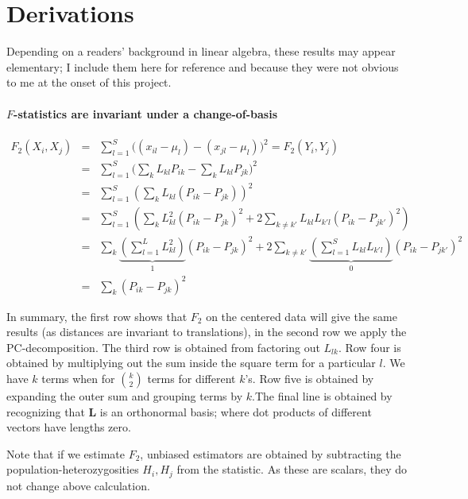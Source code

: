 \documentclass[12pt,fullpage, a4paper]{article}
\newcommand{\ML}{\mathbf{L}} %
\begin{document}
\newpage


\newpage
\appendix
\section{Derivations}\label{appendix:fonpc}
\setcounter{equation}{0}
\renewcommand{\theequation}{\thesection\arabic{equation}}
Depending on a readers' background in linear algebra, these results may appear elementary; I include them here for reference and because they were not obvious to me at the onset of this project.
\paragraph{$F$-statistics are invariant under a change-of-basis}
\begin{eqnarray}
F_2(X_i, X_j) &=& \sum_{l=1}^S \big( (x_{il} - \mu_l) -(x_{jl} -\mu_l)\big)^2 = F_2(Y_i, Y_j)\nonumber\\
&=& \sum_{l=1}^S \big( \sum_k L_{kl}P_{ik} - \sum_kL_{kl}P_{jk}\big)^2\nonumber\\
&=& \sum_{l=1}^S \left( \sum_k L_{kl} (P_{ik} -P_{jk}) \right)^2\nonumber\\
&=& \sum_{l=1}^S \left( \sum_k L_{kl}^2 (P_{ik} -P_{jk})^2 + 2\sum_{k\neq k'} L_{kl}L_{k'l}(P_{ik} - P_{jk'})^2 \right)\nonumber\\
&=& \sum_k \underbrace{\left(\sum_{l=1}^L L_{kl}^2\right)}_1 (P_{ik} -P_{jk})^2 + 2\sum_{k\neq k'}\underbrace{\left(\sum_{l=1}^S L_{kl}L_{k'l}\right)}_{0} (P_{ik} - P_{jk'})^2\nonumber\\
&=& \sum_k (P_{ik} - P_{jk})^2 \label{eq:changeofbasis}
\end{eqnarray}

In summary, the first row shows that $F_2$ on the centered data will give the same results (as distances are invariant to translations), in the second row we apply the PC-decomposition. The third row is obtained from factoring out $L_{lk}$. Row four is obtained by multiplying out the sum inside the square term for a particular $l$. We have $k$ terms when for $\binom{k}{2}$ terms for different $k$'s.  Row five is obtained by expanding the outer sum and grouping terms by $k$.The final line is obtained by recognizing that $\ML$ is an orthonormal basis; where dot products of different vectors have lengths zero.

Note that if we estimate $F_2$, unbiased estimators are obtained by subtracting the population-heterozygosities $H_i, H_j$ from the statistic. As these are scalars, they do not change above calculation.
\end{document}
